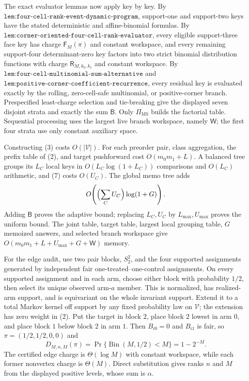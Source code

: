 The exact evaluator lemmas now apply key by key. By \(\texttt{lem:four-cell-rank-event-dynamic-program}\), support-one and support-two keys have the stated deterministic and affine-binomial formulas. By \(\texttt{lem:corner-oriented-four-cell-rank-evaluator}\), every eligible support-three face key has charge \(\mathsf F_M(\pi)\) and constant workspace, and every remaining support-four determinant-zero key factors into two strict binomial distribution functions with charge \(\mathsf R_{M,k_0,k_1}\) and constant workspace. By \(\texttt{lem:four-cell-multinomial-sum-alternative}\) and \(\texttt{lem:positive-corner-coefficient-recurrence}\), every residual key is evaluated exactly by the rolling, zero-cell-safe multinomial, or positive-corner branch. Prespecified least-charge selection and tie-breaking give the displayed seven disjoint strata and exactly the sum \(\mathsf B\). Only \(\Pi_{\mathrm{MS}}\) builds the factorial table. Sequential processing uses the largest live branch workspace, namely \(\mathsf W\); the first four strata use only constant auxiliary space.

Constructing (3) costs \(O(|\mathcal V|)\). For each preorder pair, class aggregation, the prefix table of (2), and target pushforward cost \(O(m_0m_1+L)\). A balanced tree groups its \(L_C\) local keys in \(O(L_C\log(1+L_C))\) comparisons and \(O(L_C)\) arithmetic, and (7) costs \(O(U_C)\). The global memo tree adds
\[
O\!\left(\Bigl(\sum_CU_C\Bigr)\log(1+G)\right).
\]
Adding \(\mathsf B\) proves the adaptive bound; replacing \(L_C,U_C\) by \(L_{\max},U_{\max}\) proves the uniform bound. The joint table, target table, largest local grouping table, \(G\) memoized answers, and selected branch workspace give \(O(m_0m_1+L+U_{\max}+G+\mathsf W)\) memory.

For the edge audit, use two pair blocks, \(S_2^2\), and the four supported assignments generated by independent fair one-treated--one-control assignments. On every supported assignment and in each arm, choose either block with probability \(1/2\), then select its unique observed arm-\(a\) member. This is normalized, has realized-arm support, and is equivariant on the whole invariant support. Extend it to a total Markov kernel off support by any fixed probability law on \(\mathcal V\); the extension has zero weight in (2). Put the target in block \(2\), place block \(2\) lowest in arm \(0\), and place block \(1\) below block \(2\) in arm \(1\). Then \(B_{i0}=0\) and \(B_{i1}\) is fair, so \(\pi=(1/2,1/2,0,0)\) and
\[
D_{M,n,M}(\pi)=\Pr\{\operatorname{Bin}(M,1/2)<M\}=1-2^{-M}.
\]
The certified edge charge is \(\Theta(\log M)\) with constant workspace, while each former nonvertex charge is \(\Theta(M)\). Direct substitution gives ranks \(n\) and \(M\) from the displayed positive levels, whose sum is \(\alpha\).

